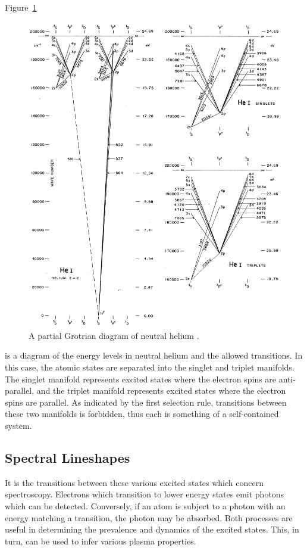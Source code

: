 {Figure~\ref{fig:grotrian}
\begin{figure}
  \centering
  \includegraphics{./chapters/theory/figures/grotrian.pdf}
  \caption{A partial Grotrian diagram of neutral helium \cite{Moore1968}.}
  \label{fig:grotrian}
\end{figure}
is a diagram of the energy levels in neutral helium and the allowed transitions.
In this case, the atomic states are separated into the singlet and triplet
manifolds. The singlet manifold represents excited states where the electron
spins are anti-parallel, and the triplet manifold represents excited states
where the electron spins are parallel. As indicated by the first selection rule,
transitions between these two manifolds is forbidden, thus each is something of
a self-contained system.

\subsection{Spectral Lineshapes}

It is the transitions between these various excited states which concern
spectroscopy. Electrons which transition to lower energy states emit photons
which can be detected. Conversely, if an atom is subject to a photon with an
energy matching a transition, the photon may be absorbed. Both processes are
useful in determining the prevalence and dynamics of the excited states. This,
in turn, can be used to infer various plasma properties.

}
